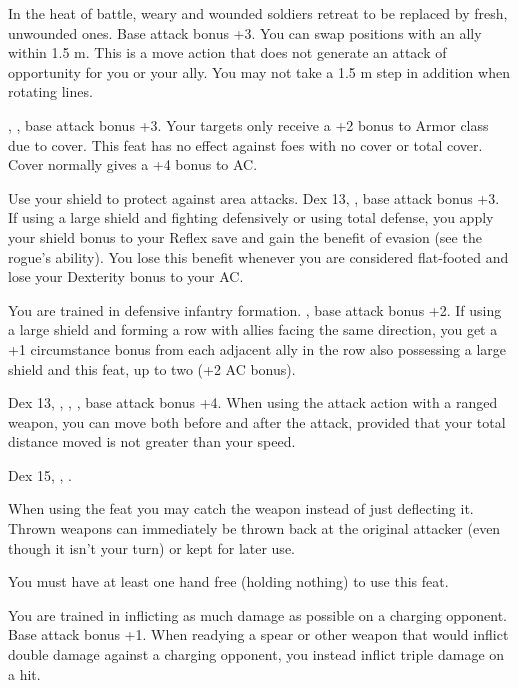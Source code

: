 {In the heat of battle, weary and wounded soldiers retreat to be replaced by fresh, unwounded ones.}
{Base attack bonus +3.}
{You can swap positions with an ally within 1.5 m. This is a move action that does not generate an attack of opportunity for you or your ally. You may not take a 1.5 m step in addition when rotating lines.}{}{}

{}
{, , base attack bonus +3.}
{Your targets only receive a +2 bonus to Armor class due to cover. This feat has no effect against foes with no cover or total cover.}
{Cover normally gives a +4 bonus to AC.}{}

{Use your shield to protect against area attacks.}
{Dex 13, , base attack bonus +3.}
{If using a large shield and fighting defensively or using total defense, you apply your shield bonus to your Reflex save and gain the benefit of evasion (see the rogue's ability). You lose this benefit whenever you are considered flat-footed and lose your Dexterity bonus to your AC.}{}{}

{You are trained in defensive infantry formation.}
{, base attack bonus +2.}
{If using a large shield and forming a row with allies facing the same direction, you get a +1 circumstance bonus from each adjacent ally in the row also possessing a large shield and this feat, up to two (+2 AC bonus).}{}{}

{Dex 13, , , , base attack bonus +4.}
{When using the attack action with a ranged weapon, you can move both before and after the attack, provided that your total distance moved is not greater than your speed.}

{Dex 15, , .}
{When using the  feat you may catch the weapon instead of just deflecting it. Thrown weapons can immediately be thrown back at the original attacker (even though it isn't your turn) or kept for later use.

You must have at least one hand free (holding nothing) to use this feat.}

{You are trained in inflicting as much damage as possible on a charging opponent.}
{Base attack bonus +1.}
{When readying a spear or other weapon that would inflict double damage against a charging opponent, you instead inflict triple damage on a hit.}{}{}

